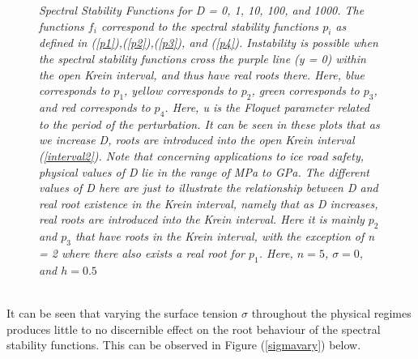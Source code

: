 \documentclass{article}
\begin{document}
\begin{figure}[hbt!]
\vspace{-15}
\caption{\emph{Spectral Stability Functions for D = 0, 1, 10, 100, and 1000. The functions \(f_i\) correspond to the spectral stability functions \(p_i\) as defined in (\ref{p1}),(\ref{p2}),(\ref{p3}), and (\ref{p4}). Instability is possible when the spectral stability functions cross the purple line (y = 0) within the open Krein interval, and thus have real roots there. Here, blue corresponds to \(p_1\), yellow corresponds to \(p_2\), green corresponds to \(p_3\), and red corresponds to \(p_4\). Here, u is the Floquet parameter related to the period of the perturbation. It can be seen in these plots that as we increase D, roots are introduced into the open Krein interval (\ref{interval2}). Note that concerning applications to ice road safety, physical values of D lie in the range of MPa to GPa. The different values of D here are just to illustrate the relationship between D and real root existence in the Krein interval, namely that as D increases, real roots are introduced into the Krein interval. Here it is mainly \(p_2\) and \(p_3\) that have roots in the Krein interval, with the exception of n = 2 where there also exists a real root for \(p_1\). Here, \(n = 5\), \(\sigma = 0\), and \(h = 0.5\)}} \label{Dvary}
\end{figure}

\\



It can be seen that varying the surface tension \(\sigma\) throughout the physical regimes produces little to no discernible effect on the root behaviour of the spectral stability functions. This can be observed in Figure (\ref{sigmavary}) below. \\
\end{document}
